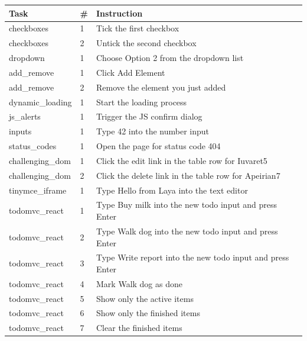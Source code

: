\begin{tabular}{@{}llp{9.4cm}@{}}
\toprule
Task & \# & Instruction \\
\midrule
checkboxes & 1 & Tick the first checkbox \\
checkboxes & 2 & Untick the second checkbox \\
dropdown & 1 & Choose Option 2 from the dropdown list \\
add\_remove & 1 & Click Add Element \\
add\_remove & 2 & Remove the element you just added \\
dynamic\_loading & 1 & Start the loading process \\
js\_alerts & 1 & Trigger the JS confirm dialog \\
inputs & 1 & Type \textquotesingle{}42\textquotesingle{} into the number input \\
status\_codes & 1 & Open the page for status code 404 \\
challenging\_dom & 1 & Click the edit link in the table row for \textquotesingle{}Iuvaret5\textquotesingle{} \\
challenging\_dom & 2 & Click the delete link in the table row for \textquotesingle{}Apeirian7\textquotesingle{} \\
tinymce\_iframe & 1 & Type \textquotesingle{}Hello from Laya\textquotesingle{} into the text editor \\
todomvc\_react & 1 & Type \textquotesingle{}Buy milk\textquotesingle{} into the new todo input and press Enter \\
todomvc\_react & 2 & Type \textquotesingle{}Walk dog\textquotesingle{} into the new todo input and press Enter \\
todomvc\_react & 3 & Type \textquotesingle{}Write report\textquotesingle{} into the new todo input and press Enter \\
todomvc\_react & 4 & Mark \textquotesingle{}Walk dog\textquotesingle{} as done \\
todomvc\_react & 5 & Show only the active items \\
todomvc\_react & 6 & Show only the finished items \\
todomvc\_react & 7 & Clear the finished items \\
\bottomrule
\end{tabular}
